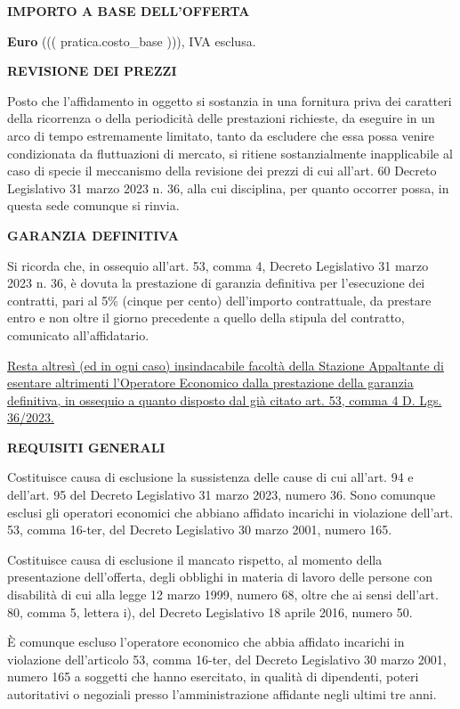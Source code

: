 \textbf{IMPORTO A BASE DELL'OFFERTA}

\textbf{Euro} ((( pratica.costo_base ))), IVA esclusa.

\textbf{REVISIONE DEI PREZZI}

Posto che l'affidamento in oggetto si sostanzia in una fornitura priva
dei caratteri della ricorrenza o della periodicità delle prestazioni
richieste, da eseguire in un arco di tempo estremamente limitato, tanto da
escludere che essa possa venire condizionata da fluttuazioni di mercato,
si ritiene sostanzialmente inapplicabile al caso di specie il meccanismo
della revisione dei prezzi di cui all'art. 60 Decreto Legislativo
31 marzo 2023 n. 36, alla cui disciplina, per quanto occorrer possa,
in questa sede comunque si rinvia.

\textbf{GARANZIA DEFINITIVA}

Si ricorda che, in ossequio all'art. 53, comma 4, Decreto Legislativo
31 marzo 2023 n. 36, è dovuta la prestazione di garanzia definitiva per
l'esecuzione dei contratti, pari al 5\% (cinque per cento) dell'importo
contrattuale, da prestare entro e non oltre il giorno precedente a quello
della stipula del contratto, comunicato all'affidatario.

\ul{Resta altres\`i (ed in ogni caso) insindacabile facolt\`a della
Stazione Appaltante di esentare altrimenti l'Operatore Economico dalla
prestazione della garanzia definitiva, in ossequio a quanto disposto
dal gi\`a citato art. 53, comma 4 D. Lgs. 36/2023.}

\textbf{REQUISITI GENERALI}

Costituisce causa di esclusione la sussistenza delle cause di cui
all'art. 94 e dell'art. 95 del Decreto Legislativo 31 marzo 2023,
numero 36. Sono comunque esclusi gli operatori economici che abbiano
affidato incarichi in violazione dell'art. 53, comma 16-ter, del
Decreto Legislativo 30 marzo 2001, numero 165.

Costituisce causa di esclusione il mancato rispetto, al momento della
presentazione dell'offerta, degli obblighi in materia di lavoro delle
persone con disabilità di cui alla legge 12 marzo 1999, numero 68,
oltre che ai sensi dell'art. 80, comma 5, lettera i), del Decreto
Legislativo 18 aprile 2016, numero 50.

È comunque escluso l'operatore economico che abbia affidato incarichi
in violazione dell'articolo 53, comma 16-ter, del Decreto Legislativo
30 marzo 2001, numero 165 a soggetti che hanno esercitato, in qualità
di dipendenti, poteri autoritativi o negoziali presso l'amministrazione
affidante negli ultimi tre anni.

